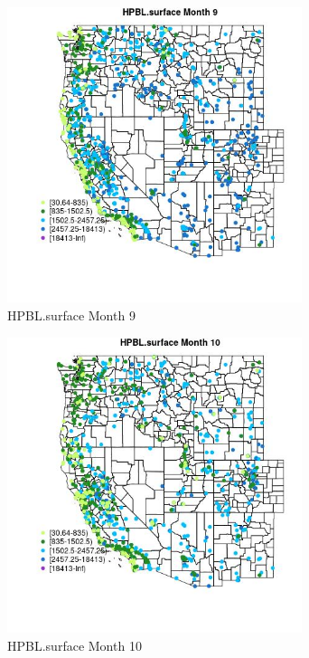 \begin{figure} 
\centering  
\includegraphics[width=0.77\textwidth]{Code_Outputs/Report_ML_input_PM25_Step4_part_f_de_duplicated_aveswNAs_MapObsMo9HPBLsurface.jpg} 
\caption{\label{fig:Report_ML_input_PM25_Step4_part_f_de_duplicated_aveswNAsMapObsMo9HPBLsurface}HPBL.surface Month 9} 
\end{figure} 
 

\clearpage 

\begin{figure} 
\centering  
\includegraphics[width=0.77\textwidth]{Code_Outputs/Report_ML_input_PM25_Step4_part_f_de_duplicated_aveswNAs_MapObsMo10HPBLsurface.jpg} 
\caption{\label{fig:Report_ML_input_PM25_Step4_part_f_de_duplicated_aveswNAsMapObsMo10HPBLsurface}HPBL.surface Month 10} 
\end{figure} 
 

